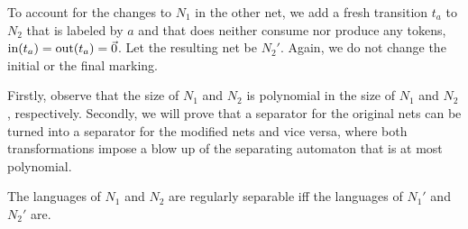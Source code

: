 \documentclass[../../diss.tex]{subfiles}
\begin{document}
To account for the changes to $N_1$ in the other net, we add a fresh transition $t_a$ to $N_2$ that is labeled by $a$ and that does neither consume nor produce any tokens, $\text{in}(t_a) = \text{out}(t_a) = \vec{0}$.
Let the resulting net be $N_2'$.
Again, we do not change the initial or the final marking.

Firstly, observe that the size of $N_1$ and $N_2$ is polynomial in the size of $N_1$ and $N_2$, respectively.
Secondly, we will prove that a separator for the original nets can be turned into a separator for the modified nets and vice versa, where both transformations impose a blow up of the separating automaton that is at most polynomial.

\begin{lemma}%
\label{Lemma:PNSeparabilityEliminatingEpsilon}%
    The languages of $N_1$ and $N_2$ are regularly separable iff the languages of $N_1'$ and $N_2'$ are.
\end{lemma}
\end{document}
